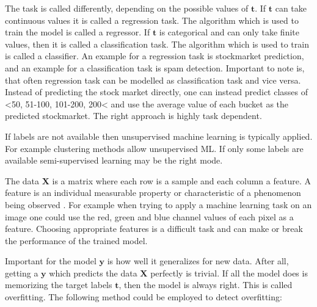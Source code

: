 \documentclass[draft,final,oneside]{vutinfth} %
\begin{document}
The task is called differently, depending on the possible values of $\boldsymbol{t}$. If $\boldsymbol{t}$ can take continuous values it is called a regression task. The algorithm which is used to train the model is called a regressor. If $\boldsymbol{t}$ is categorical and can only take finite values, then it is called a classification task. The algorithm which is used to train is called a classifier. An example for a regression task is stockmarket prediction, and an example for a classification task is spam detection. Important to note is, that often regression task can be modelled as classification task and vice versa. Instead of predicting the stock market directly, one can instead predict classes of <50, 51-100, 101-200, 200< and use the average value of each bucket as the predicted stockmarket. The right approach is highly task dependent.

If labels are not available then unsupervised machine learning is typically applied. For example clustering methods allow unsupervised ML. If only some labels are available semi-supervised learning may be the right mode.

The data $\boldsymbol{X}$ is a matrix where each row is a sample and each column a feature. A feature is an individual measurable property or characteristic of a phenomenon being observed \cite{bishop}. For example when trying to apply a machine learning task on an image one could use the red, green and blue channel values of each pixel as a feature. Choosing appropriate features is a difficult task and can make or break the performance of the trained model.

Important for the model $\boldsymbol{y}$ is how well it generalizes for new data. After all, getting a $\boldsymbol{y}$ which predicts the data $\boldsymbol{X}$ perfectly is trivial. If all the model does is memorizing the target labels $\boldsymbol{t}$, then the model is always right. This is called overfitting. The following method could be employed to detect overfitting:
\end{document}
